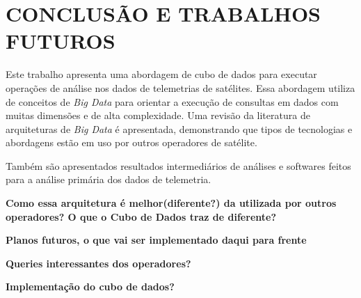 
\chapter{CONCLUSÃO E TRABALHOS FUTUROS}

Este trabalho apresenta uma abordagem de cubo de dados para executar operações de análise nos dados de telemetrias de satélites. Essa abordagem utiliza de conceitos de \textit{Big Data} para orientar a execução de consultas em dados com muitas dimensões e de alta complexidade. Uma revisão da literatura de arquiteturas de \textit{Big Data} é apresentada, demonstrando que tipos de tecnologias e abordagens estão em uso por outros operadores de satélite.

Também são apresentados resultados intermediários de análises e softwares feitos para a análise primária dos dados de telemetria. 

\textbf{Como essa arquitetura é melhor(diferente?) da utilizada por outros operadores? O que o Cubo de Dados traz de diferente?}

\textbf{Planos futuros, o que vai ser implementado daqui para frente}

\textbf{Queries interessantes dos operadores?}

\textbf{Implementação do cubo de dados?}

